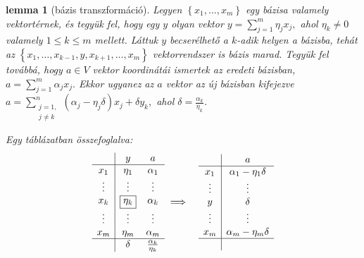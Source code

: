\documentclass[9pt, showtrims]{memoir}
\theoremstyle{plain}
\newtheorem{lemma}[proposition]{lemma}
\theoremstyle{remark}
\theoremstyle{definition}
\begin{document}
\begin{lemma}[bázis transzformáció]\label{le:bazistrafo}
    Legyen $\left\{ x_1,\dots,x_m \right\}$ egy bázisa valamely vektortérnek,
    és tegyük fel, 
    hogy egy $y$ olyan vektor
    \(
        y=\sum_{j=1}^m\eta_jx_j,
    \)
    ahol $\eta_k\neq 0$ valamely $1\leq k\leq m$ mellett. 
    Láttuk $y$ becserélhető a $k$-adik helyen a bázisba, 
    tehát az
    \(
        \left\{ x_1,\dots,x_{k-1},y,x_{k+1},\dots,x_m \right\}
    \)
    vektorrendszer is bázis marad.
    Tegyük fel továbbá, hogy $a\in V$ vektor koordinátái ismertek az eredeti bázisban,
    \(
        a=
        \sum_{j=1}^m\alpha_j x_j.
    \)
    Ekkor ugyanez az $a$ vektor az új bázisban kifejezve
    \(
        a=
        \sum_{\substack{j=1,\\j\neq k}}^n\left( \alpha_j-\eta_j\delta \right)x_j
        +\delta y_k,
    \)
    ahol $\delta=\frac{\alpha_k}{\eta_k}$.

    Egy táblázatban összefoglalva:
\begin{eqnarray}\label{alg:bazistrafo}
    \begin{array}{c|cc}
        &y      &a         \\
        \hline
        x_1         &\eta_1  &\alpha_1   \\
        \vdots      &\vdots &\vdots    \\
        x_k         &\boxed{\eta_k}  &\alpha_k   \\
        \vdots      &\vdots &\vdots    \\
        x_m         &\eta_m  &\alpha_m   \\
        \hline
        &\delta &\frac{\alpha_k}{\eta_k}
    \end{array}
    &\implies&
    \begin{array}{c|c}
                    &a                       \\
        \hline
        x_1         &\alpha_1-\eta_1\delta   \\
        \vdots      &\vdots                  \\
        y           &\delta                  \\
        \vdots      &\vdots                  \\
        x_m         &\alpha_m-\eta_m\delta   \\
        \hline
        \phantom{\delta}&
    \end{array}
\end{eqnarray}
\end{lemma}
\end{document}

